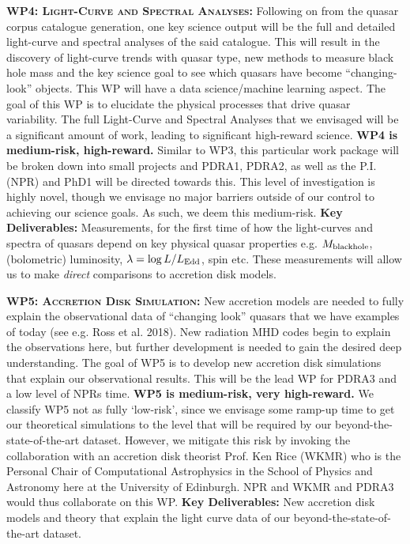 \documentclass[oneside, a4paper, onecolumn, 11pt]{article}
\begin{document}
\smallskip
\smallskip
\noindent
\textbf{\textsc{WP4: Light-Curve and Spectral Analyses:}} 
Following on from the quasar corpus catalogue generation, one key
science output will be the full and detailed light-curve and spectral
analyses of the said catalogue. This will result in the discovery of
light-curve trends with quasar type, new methods to measure black hole
mass and the key science goal to see which quasars have become
``changing-look'' objects. This WP will have a data science/machine learning 
aspect.
The goal of this WP is to elucidate the physical processes that drive quasar variability.
The full Light-Curve and Spectral
Analyses that we envisaged will be a significant amount of work,
leading to significant high-reward science. 
{\bf WP4 is medium-risk, high-reward.}
Similar to WP3, this particular work
package will be broken down into small projects and 
PDRA1, PDRA2, as well as the P.I. (NPR) and PhD1 will be directed towards this. This level of investigation 
is highly novel, though we envisage no major barriers outside of our control to
 achieving our science goals. As such, we deem this medium-risk.
{\bf Key Deliverables:} Measurements, for the first time of how the 
light-curves and spectra of quasars depend on key physical 
quasar properties e.g. $M_{\rm black hole}$, (bolometric) luminosity, $\lambda = \log L / L_{\rm Edd}$, spin etc. 
These measurements will allow us to make {\it direct} comparisons to accretion disk models. 


\smallskip
\smallskip
\noindent
\textbf{\textsc{WP5: Accretion Disk Simulation:}} 
New accretion models are needed to fully explain the observational
data of ``changing look'' quasars that we have examples of today (see
e.g. Ross et al. 2018). New radiation MHD codes begin to explain the
observations here, but further development is needed to gain the
desired deep understanding. 
The goal of WP5 is to develop new accretion disk simulations that
explain our observational results.  This will be the lead WP for 
PDRA3 and a low level of NPRs time. 
{\bf WP5 is medium-risk, very high-reward.} We
classify WP5 not as fully `low-risk', since we envisage some ramp-up
time to get our theoretical simulations to the level that will be required by 
our beyond-the-state-of-the-art dataset. However, we mitigate this risk
by invoking the collaboration with an accretion disk theorist
Prof. Ken Rice (WKMR) who is the Personal Chair of Computational
Astrophysics in the School of Physics and Astronomy here at the
University of Edinburgh. NPR and WKMR and PDRA3 would thus collaborate 
on this WP. 
{\bf Key Deliverables:} New accretion disk models and theory that explain the 
light curve data of our beyond-the-state-of-the-art dataset. 
\end{document}
